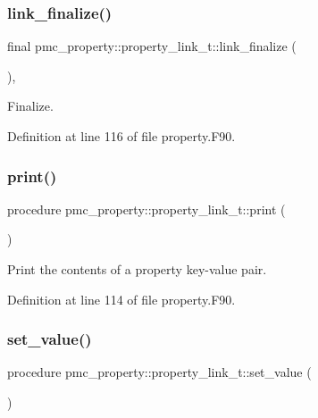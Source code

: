 \subsubsection{\texorpdfstring{link\+\_\+finalize()}{link\_finalize()}}
{\footnotesize\ttfamily final pmc\+\_\+property\+::property\+\_\+link\+\_\+t\+::link\+\_\+finalize (\begin{DoxyParamCaption}{ }\end{DoxyParamCaption})\hspace{0.3cm}{\ttfamily [final]}, {\ttfamily [private]}}



Finalize. 



Definition at line 116 of file property.\+F90.

\mbox{\label{structpmc__property_1_1property__link__t_add3f9442af45f91b2d5fe7e8a930df85}} 
\subsubsection{\texorpdfstring{print()}{print()}}
{\footnotesize\ttfamily procedure pmc\+\_\+property\+::property\+\_\+link\+\_\+t\+::print (\begin{DoxyParamCaption}{ }\end{DoxyParamCaption})\hspace{0.3cm}{\ttfamily [private]}}



Print the contents of a property key-\/value pair. 



Definition at line 114 of file property.\+F90.

\mbox{\label{structpmc__property_1_1property__link__t_af1fda3847e4a911454e6a94e910b2dcc}} 
\subsubsection{\texorpdfstring{set\+\_\+value()}{set\_value()}}
{\footnotesize\ttfamily procedure pmc\+\_\+property\+::property\+\_\+link\+\_\+t\+::set\+\_\+value (\begin{DoxyParamCaption}{ }\end{DoxyParamCaption})\hspace{0.3cm}{\ttfamily [private]}}



